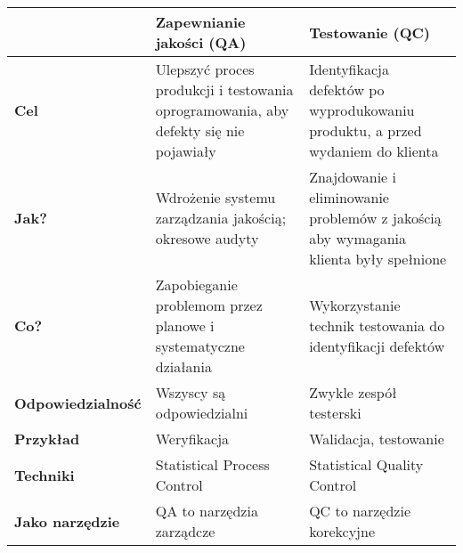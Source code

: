 \documentclass[../main.tex]{subfiles}
\begin{document}
    \begin{table}[H]
        \begin{center}
            \begin{tabular}{| p{3cm} || p{6cm} | p{6cm} |}
                \hline
                & \textbf{Zapewnianie jakości (QA)} & \textbf{Testowanie (QC)}    \\
                \hline
                \hline
                \textbf{Cel} & Ulepszyć proces produkcji i testowania oprogramowania,
                aby defekty się nie pojawiały & Identyfikacja defektów po wyprodukowaniu produktu,
                a przed wydaniem do klienta \\
                \hline
                \textbf{Jak?} & Wdrożenie systemu zarządzania jakością; okresowe audyty &
                Znajdowanie i eliminowanie problemów z jakością aby wymagania klienta były spełnione \\
                \hline
                \textbf{Co?} & Zapobieganie problemom przez planowe i systematyczne działania
                & Wykorzystanie technik testowania do identyfikacji defektów \\
                \hline
                \textbf{Odpowiedzialność} & Wszyscy są odpowiedzialni         & Zwykle zespół testerski     \\
                \hline
                \textbf{Przykład}         & Weryfikacja                       & Walidacja, testowanie       \\
                \hline
                \textbf{Techniki}         & Statistical Process Control       & Statistical Quality Control \\
                \hline
                \textbf{Jako narzędzie}   & QA to narzędzia zarządcze         & QC to narzędzie korekcyjne  \\
                \hline
            \end{tabular}
        \end{center}
    \end{table}
\end{document}
